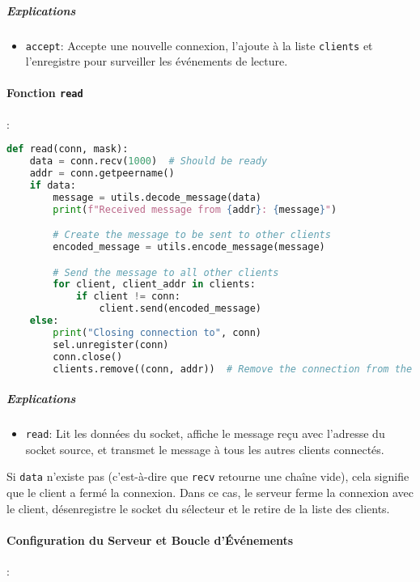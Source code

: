 \documentclass{article}
\begin{document}
\subparagraph{Explications}

\begin{itemize}
    \item \texttt{accept}: Accepte une nouvelle connexion, l'ajoute à la liste \texttt{clients} et l'enregistre pour surveiller les événements de lecture.
\end{itemize}

\paragraph{Fonction \texttt{read}}:

\begin{lstlisting}[language=Python, caption=read dans serv.py]
def read(conn, mask):
    data = conn.recv(1000)  # Should be ready
    addr = conn.getpeername()
    if data:
        message = utils.decode_message(data)
        print(f"Received message from {addr}: {message}")

        # Create the message to be sent to other clients
        encoded_message = utils.encode_message(message)

        # Send the message to all other clients
        for client, client_addr in clients:
            if client != conn:
                client.send(encoded_message)
    else:
        print("Closing connection to", conn)
        sel.unregister(conn)
        conn.close()
        clients.remove((conn, addr))  # Remove the connection from the clients list
\end{lstlisting}

\subparagraph{Explications}

\begin{itemize}
    \item \texttt{read}: Lit les données du socket, affiche le message reçu avec l'adresse du socket source, et transmet le message à tous les autres clients connectés.
\end{itemize}

{Si \texttt{data} n'existe pas (c'est-à-dire que \texttt{recv} retourne une chaîne vide), cela signifie que le client a fermé la connexion. Dans ce cas, le serveur ferme la connexion avec le client, désenregistre le socket du sélecteur et le retire de la liste des clients.}

\break\paragraph{Configuration du Serveur et Boucle d'Événements}:
\end{document}
